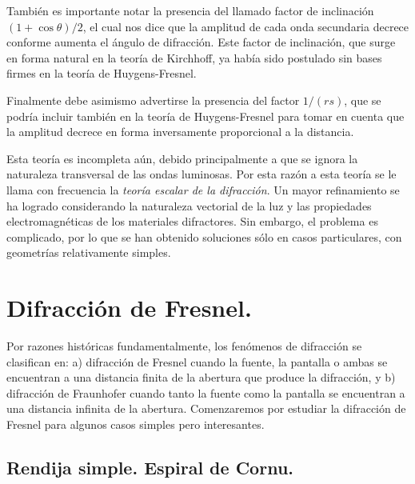 \documentclass[14pt]{extarticle}
\begin{document}
\par
También es importante notar la presencia del llamado factor de inclinación $(1 + \cos \theta)/2$, el cual nos dice que la amplitud de cada onda secundaria decrece conforme aumenta el ángulo de difracción. Este factor de inclinación, que surge en forma natural en la teoría de Kirchhoff, ya había sido postulado sin bases firmes en la teoría de Huygens-Fresnel.
\par
Finalmente debe asimismo advertirse la presencia del factor $1/(rs)$, que se podría incluir también en la teoría de Huygens-Fresnel para tomar en cuenta que la amplitud decrece en forma inversamente proporcional a la distancia.
\par
Esta teoría es incompleta aún, debido principalmente a que se ignora la naturaleza transversal de las ondas luminosas. Por esta razón a esta teoría se le llama con frecuencia la \textit{teoría escalar de la difracción}. Un mayor refinamiento se ha logrado considerando la naturaleza vectorial de la luz y las propiedades electromagnéticas de los materiales difractores. Sin embargo, el problema es complicado, por lo que se han obtenido soluciones sólo en casos particulares, con geometrías relativamente simples.

\section{Difracción de Fresnel.}

Por razones históricas fundamentalmente, los fenómenos de difracción se clasifican en: a) difracción de Fresnel cuando la fuente, la pantalla o ambas se encuentran a una distancia finita de la abertura que produce la difracción, y b) difracción de Fraunhofer cuando tanto la fuente como la pantalla se encuentran a una distancia infinita de la abertura. Comenzaremos por estudiar la difracción de Fresnel para algunos casos simples pero interesantes.

\subsection{Rendija simple. Espiral de Cornu.}
\end{document}
